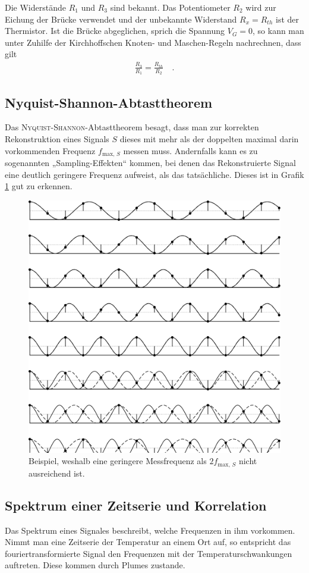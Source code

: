 \documentclass[12pt,a4paper,titlepage,headinclude]{scrartcl}
\numberwithin{equation}{subsection}
\begin{document}
Die Widerstände $R_1$ und $R_3$ sind bekannt.
Das Potentiometer $R_2$ wird zur Eichung der Brücke verwendet und der unbekannte Widerstand $R_x=R_{th}$ ist der Thermistor.
Ist die Brücke abgeglichen, sprich die Spannung $V_G=0$, so kann man unter Zuhilfe der Kirchhoffschen Knoten- und Maschen-Regeln nachrechnen, dass gilt
\begin{align*}
	\frac{R_3}{R_1}=\frac{R_{th}}{R_2}\quad.
\end{align*}

\subsection{Nyquist-Shannon-Abtasttheorem}
Das \textsc{Nyquist-Shannon}-Abtasttheorem besagt, dass man zur korrekten Rekonstruktion eines Signals $S$ dieses mit mehr als der doppelten maximal darin vorkommenden Frequenz $f_{\text{max, }S}$ messen muss.
Andernfalls kann es zu sogenannten „Sampling-Effekten“ kommen, bei denen das Rekonstruierte Signal eine deutlich geringere Frequenz aufweist, als das tatsächliche.
Dieses ist in Grafik \ref{fig:nyquist} gut zu erkennen.
\begin{figure}[h]
  \centering
  \includegraphics[width=0.4\linewidth]{nyquist}
  \caption{Beispiel, weshalb eine geringere Messfrequenz als $2f_{\text{max, }S}$ nicht ausreichend ist.\protect\footnotemark\label{fig:nyquist}}
\end{figure}

\subsection{Spektrum einer Zeitserie und Korrelation}
Das Spektrum eines Signales beschreibt, welche Frequenzen in ihm vorkommen.
Nimmt man eine Zeitserie der Temperatur an einem Ort auf, so entspricht das fouriertransformierte Signal den Frequenzen mit der Temperaturschwankungen auftreten.
Diese kommen durch Plumes zustande.
\end{document}
